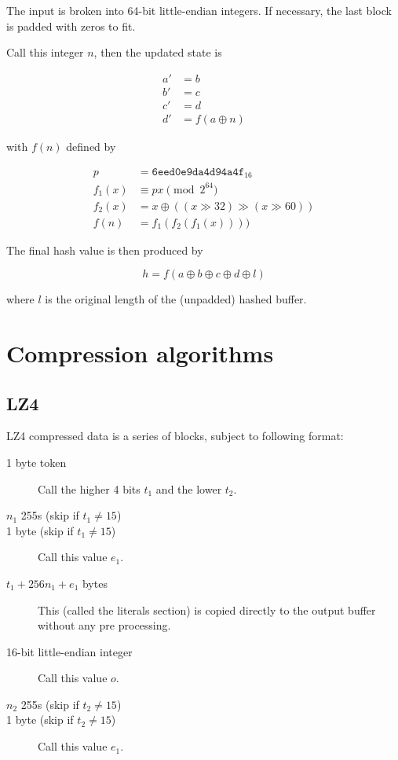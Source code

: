 \documentclass[11pt,a4paper]{report}
\begin{document}
        The input is broken into 64-bit little-endian integers. If necessary,
        the last block is padded with zeros to fit.

        Call this integer $n$, then the updated state is

        \begin{align*}
            a' &= b \\
            b' &= c \\
            c' &= d \\
            d' &= f(a \oplus n)
        \end{align*}

        with $f(n)$ defined by

        \begin{align*}
            p      &=      \texttt{6eed0e9da4d94a4f}_{16} \\
            f_1(x) &\equiv px \pmod{2^{64}} \\
            f_2(x) &=      x \oplus ((x \gg 32) \gg (x \gg 60)) \\
            f(n)   &=      f_1(f_2(f_1(x))))
        \end{align*}

        The final hash value is then produced by

        $$h = f(a \oplus b \oplus c \oplus d \oplus l) $$

        where $l$ is the original length of the (unpadded) hashed buffer.

    \section{Compression algorithms}
        \subsection{LZ4}
        \label{compression:lz4}
        LZ4 compressed data is a series of blocks, subject to following format:

        \begin{description}
            \item [1 byte token] Call the higher 4 bits $t_1$ and the lower $t_2$.
            \item [$n_1$ 255s (skip if $t_1 \neq 15$)]
            \item [1 byte (skip if $t_1 \neq 15$)] Call this value $e_1$.
            \item [$t_1 + 256n_1 + e_1$ bytes] This (called the literals
                section) is copied directly to the output buffer without any
                pre processing.
            \item [16-bit little-endian integer] Call this value $o$.
            \item [$n_2$ 255s (skip if $t_2 \neq 15$)]
            \item [1 byte (skip if $t_2 \neq 15$)] Call this value $e_1$.
        \end{description}
\end{document}
